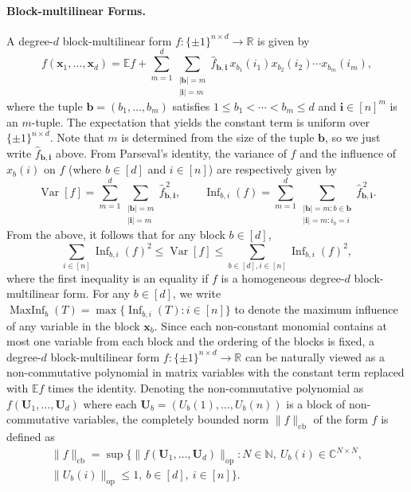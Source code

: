 \paragraph{Block-multilinear Forms.}
A degree-$d$ block-multilinear form $f:\{\pm1\}^{n\times d}\to\mathbb R$ is given by
\[f(\mathbf x_1,\ldots,\mathbf x_d)=\mathbb Ef+\sum_{m=1}^d\sum_{\substack{|\mathbf b|=m\\|\mathbf i|=m}}\widehat f_{\mathbf b,\mathbf i}\,x_{b_1}(i_1)x_{b_2}(i_2)\cdots x_{b_m}(i_m),\tag{6}\]
where the tuple $\mathbf b=(b_1,\ldots,b_m)$ satisfies $1\leq b_1<\cdots<b_m\leq d$ and $\mathbf i\in[n]^m$ is an $m$-tuple. The expectation that yields the constant term is uniform over $\{\pm1\}^{n\times d}$. Note that $m$ is determined from the size of the tuple $\mathbf b$, so we just write $\widehat f_{\mathbf b,\mathbf i}$ above.
From Parseval's identity, the variance of $f$ and the influence of $x_b(i)$ on $f$ (where $b\in[d]$ and $i\in[n]$) are respectively given by
\[\operatorname{Var}[f]=\sum_{m=1}^d\sum_{\substack{|\mathbf b|=m\\|\mathbf i|=m}}\widehat f_{\mathbf b,\mathbf i}^{\,2},\qquad\operatorname{Inf}_{b,i}(f)=\sum_{m=1}^d\sum_{\substack{|\mathbf b|=m:b\in\mathbf b\\|\mathbf i|=m:i_b=i}}\widehat f_{\mathbf b,\mathbf i}^{\,2}.\]
From the above, it follows that for any block $b\in[d]$,
\[\sum_{i\in[n]}\operatorname{Inf}_{b,i}(f)^2\leq\operatorname{Var}[f]\leq\sum_{b\in[d],i\in[n]}\operatorname{Inf}_{b,i}(f)^2,\tag{7}\]
where the first inequality is an equality if $f$ is a homogeneous degree-$d$ block-multilinear form. For any $b\in[d]$, we write $\operatorname{MaxInf}_b(T)=\max\{\operatorname{Inf}_{b,i}(T):i\in[n]\}$ to denote the maximum influence of any variable in the block $\mathbf x_b$.
Since each non-constant monomial contains at most one variable from each block and the ordering of the blocks is fixed, a degree-$d$ block-multilinear form $f:\{\pm1\}^{n\times d}\to\mathbb R$ can be naturally viewed as a non-commutative polynomial in matrix variables with the constant term replaced with $\mathbb Ef$ times the identity. Denoting the non-commutative polynomial as $f(\mathbf U_1,\ldots,\mathbf U_d)$ where each $\mathbf U_b=(U_b(1),\ldots,U_b(n))$ is a block of non-commutative variables, the completely bounded norm $\|f\|_{\mathrm{cb}}$ of the form $f$ is defined as
\begin{multline*}
\|f\|_{\mathrm{cb}}=\sup\{\|f(\mathbf U_1,\ldots,\mathbf U_d)\|_{\mathrm{op}}:N\in\mathbb N,\ U_b(i)\in\mathbb C^{N\times N},\\
\|U_b(i)\|_{\mathrm{op}}\leq1,\ b\in[d],\ i\in[n]\}.
\end{multline*}
